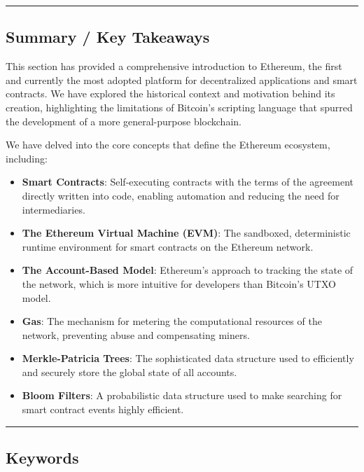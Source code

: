 \begin{center}\rule{0.5\linewidth}{0.5pt}\end{center}

\subsection{Summary / Key Takeaways}\label{summary-key-takeaways}

This section has provided a comprehensive introduction to Ethereum, the
first and currently the most adopted platform for decentralized applications and smart
contracts. We have explored the historical context and motivation behind
its creation, highlighting the limitations of Bitcoin's scripting
language that spurred the development of a more general-purpose
blockchain.

We have delved into the core concepts that define the Ethereum
ecosystem, including:

\begin{itemize}
	\tightlist
	\item
	\textbf{Smart Contracts}: Self-executing contracts with the terms of
	the agreement directly written into code, enabling automation and
	reducing the need for intermediaries.
	\item
	\textbf{The Ethereum Virtual Machine (EVM)}: The sandboxed,
	deterministic runtime environment for smart contracts on the Ethereum
	network.
	\item
	\textbf{The Account-Based Model}: Ethereum's approach to tracking the
	state of the network, which is more intuitive for developers than
	Bitcoin's UTXO model.
	\item
	\textbf{Gas}: The mechanism for metering the computational resources
	of the network, preventing abuse and compensating miners.
	\item
	\textbf{Merkle-Patricia Trees}: The sophisticated data structure used
	to efficiently and securely store the global state of all accounts.
	\item
	\textbf{Bloom Filters}: A probabilistic data structure used to make
	searching for smart contract events highly efficient.
\end{itemize}


\begin{center}\rule{0.5\linewidth}{0.5pt}\end{center}

\subsection{Keywords}\label{keywords}

